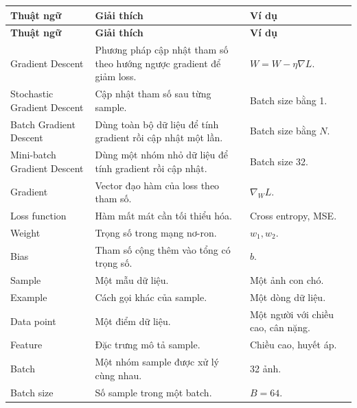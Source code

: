 \documentclass[12pt,a4paper]{report}
\begin{document}
\small
\begin{longtable}{p{}p{}p{}}
\toprule
\textbf{Thuật ngữ} & \textbf{Giải thích} & \textbf{Ví dụ} \\
\midrule
\endfirsthead

\toprule
\textbf{Thuật ngữ} & \textbf{Giải thích} & \textbf{Ví dụ} \\
\midrule
\endhead

Gradient Descent & Phương pháp cập nhật tham số theo hướng ngược gradient để giảm loss. & $W=W-\eta\nabla L$. \\

Stochastic Gradient Descent & Cập nhật tham số sau từng sample. & Batch size bằng 1. \\

Batch Gradient Descent & Dùng toàn bộ dữ liệu để tính gradient rồi cập nhật một lần. & Batch size bằng $N$. \\

Mini-batch Gradient Descent & Dùng một nhóm nhỏ dữ liệu để tính gradient rồi cập nhật. & Batch size 32. \\

Gradient & Vector đạo hàm của loss theo tham số. & $\nabla_W L$. \\

Loss function & Hàm mất mát cần tối thiểu hóa. & Cross entropy, MSE. \\

Weight & Trọng số trong mạng nơ-ron. & $w_1,w_2$. \\

Bias & Tham số cộng thêm vào tổng có trọng số. & $b$. \\

Sample & Một mẫu dữ liệu. & Một ảnh con chó. \\

Example & Cách gọi khác của sample. & Một dòng dữ liệu. \\

Data point & Một điểm dữ liệu. & Một người với chiều cao, cân nặng. \\

Feature & Đặc trưng mô tả sample. & Chiều cao, huyết áp. \\

Batch & Một nhóm sample được xử lý cùng nhau. & 32 ảnh. \\

Batch size & Số sample trong một batch. & $B=64$. \\


\end{longtable}
\end{document}
